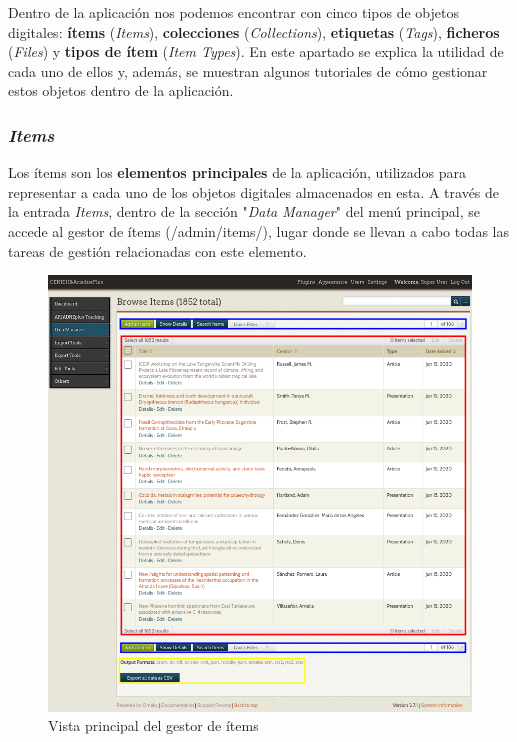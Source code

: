 \documentclass[
]{article}
\begin{document}
Dentro de la aplicación nos podemos encontrar con cinco tipos de objetos
digitales: \textbf{ítems} (\emph{Items}), \textbf{colecciones}
(\emph{Collections}), \textbf{etiquetas} (\emph{Tags}),
\textbf{ficheros} (\emph{Files}) y \textbf{tipos de ítem} (\emph{Item
Types}). En este apartado se explica la utilidad de cada uno de ellos y,
además, se muestran algunos tutoriales de cómo gestionar estos objetos
dentro de la aplicación.

\hypertarget{items}{%
\subsubsection{\texorpdfstring{\emph{Items}}{Items}}\label{items}}

Los ítems son los \textbf{elementos principales} de la aplicación,
utilizados para representar a cada uno de los objetos digitales
almacenados en esta. A través de la entrada \emph{Items}, dentro de la
sección "\emph{Data Manager}" del menú principal, se accede al gestor de
ítems ({/admin/items/}), lugar donde se llevan a cabo todas las tareas
de gestión relacionadas con este elemento.

\begin{figure}
\hypertarget{items-view}{%
\centering
\includegraphics{../_static/images/items-view.png}
\caption{Vista principal del gestor de ítems}\label{items-view}
}
\end{figure}
\end{document}

